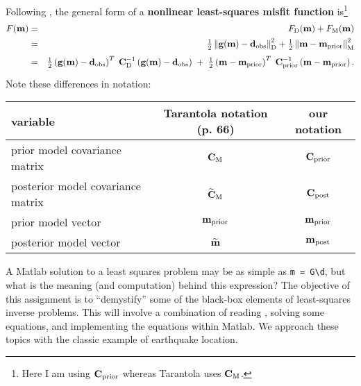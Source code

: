 \documentclass[11pt,titlepage,fleqn]{article}
\begin{document}
Following \citet[][p.~205]{Tarantola2005}, the general form of a {\bf nonlinear least-squares misfit function} is\footnote{Here I am using $\mbox{${\bf C}$}_{\rm prior}$ whereas Tarantola uses $\mbox{${\bf C}$}_{\rm M}$.}
%
\begin{eqnarray}
\misfitvar(\bem) &=& \misfitvar_{\rm D}(\bem) + \misfitvar_{\rm M}(\bem) 
\\
&=& \hlf \left\| \bg(\bem) - \bd_{\rm obs} \right\|^2_{\rm D} + \hlf \left\| \bem - \mprior \right\|^2_{\rm M}
\nonumber \\
&=& \hlf \left( \bg(\bem) - \bd_{\rm obs}\right)^T \; \covdi \left( \bg(\bem) - \bd_{\rm obs} \right)
\;+\; \hlf \left( \bem - \mprior \right)^T \; \cpriori \left( \bem - \mprior \right).
\nonumber
\label{misfit_gen}
\end{eqnarray}
%
Note these differences in notation:

\vspace{0.2cm}
\begin{tabular}{l|c|c}
\hline
variable                            & Tarantola notation (p. 66)       & our notation \\ \hline
prior model covariance matrix       & $\mbox{${\bf C}$}_{\rm M}$                     & $\mbox{${\bf C}$}_{\rm prior}$    \\ \hline
posterior model covariance matrix   & $\widetilde{\mbox{${\bf C}$}}_{\rm M}$         & $\mbox{${\bf C}$}_{\rm post}$     \\ \hline
prior model vector                  & $\mbox{${\bf m}$}_{\rm prior}$                        & $\mbox{${\bf m}$}_{\rm prior}$     \\ \hline
posterior model vector              & $\widetilde{\mbox{${\bf m}$}}$               & $\mbox{${\bf m}$}_{\rm post}$     \\ \hline
\hline
\end{tabular}
\vspace{0.2cm}

A Matlab solution to a least squares problem may be as simple as \verb+m = G\d+, but what is the meaning (and computation) behind this expression? The objective of this assignment is to ``demystify'' some of the black-box elements of least-squares inverse problems. This will involve a combination of reading \citet{Tarantola2005}, solving some equations, and implementing the equations within Matlab. We approach these topics with the classic example of earthquake location.

\end{document}

